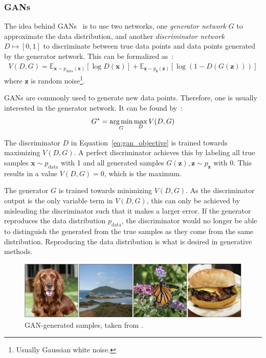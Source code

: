 \subsubsection{\aclp{GAN}}\label{subsubsec:gans}

The idea behind \acp{GAN}~\citep{goodfellow2014gans} is to use two networks, one \textit{generator network} $G$ to approximate the data distribution, and another \textit{discriminator network} $D \mapsto [0, 1]$ to discriminate between true data points and data points generated by the generator network.
This can be formalized as~\citep{goodfellow2014gans}:
\begin{align}
    V(D, G)=\mathbb{E}_{\bm{x} \sim p_{\text{data}}(\bm{x})}[\log D(\bm{x})]+\mathbb{E}_{\bm{z} \sim p_{\bm{z}}(\bm{z})}[\log (1-D(G(\bm{z})))]
\end{align}
where $\bm{z}$ is random noise\footnote{Usually Gaussian white noise.}.

\acp{GAN} are commonly used to generate new data points.
Therefore, one is usually interested in the generator network.
It can be found by~\citep{goodfellow2014gans}:
\begin{align}
    G^* = \operatorname*{arg\,min}_G \max_{D} V(D, G) \label{eq:gan_objective}
\end{align}

The discriminator $D$ in Equation~\ref{eq:gan_objective} is trained towards maximizing $V(D, G)$.
A perfect discriminator achieves this by labeling all true samples $\bm{x} \sim p_{\text{data}}$ with 1 and all generated samples $G(\bm{z}), \bm{z}\sim p_{\bm{z}}$ with 0.
This results in a value $V(D, G) = 0$, which is the maximum.

The generator $G$ is trained towards minimizing $V(D, G)$.
As the discriminator output is the only variable term in $V(D, G)$, this can only be achieved by misleading the discriminator such that it makes a larger error.
If the generator reproduces the data distribution $p_{\text{data}}$, the discriminator would no longer be able to distinguish the generated from the true samples as they come from the same distribution.
Reproducing the data distribution is what is desired in generative methods.

\begin{figure}
    \centering
    \includegraphics[width=\textwidth]{images/gan_samples.png}
    \caption[\ac{GAN}-generated samples]{\ac{GAN}-generated samples, taken from \citet{brock2018large}.}
    \label{fig:gan_samples}
\end{figure}

